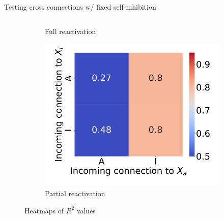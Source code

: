 \documentclass[aspectratio=169,9pt]{beamer}
\begin{document}
\begin{frame}{Testing cross connections w/ fixed self-inhibition}
\begin{columns}
\begin{column}{0.62\textwidth}
\begin{figure}[h]
\begin{subfigure}[b]{0.49\textwidth}
                            \caption{Full reactivation}
                        \end{subfigure}
                        \pause
                        \begin{subfigure}[b]{0.49\textwidth}
                            \centering
                            \includegraphics[width=\textwidth]{vary_cross-II-Partial_timeshifted-rsq-hmap}
                            \caption{Partial reactivation}
                        \end{subfigure}
                    \pause[2]\caption{Heatmaps of $R^2$ values}
                \end{figure}
            \end{column}
        \end{columns}
    \end{frame}
\end{document}
